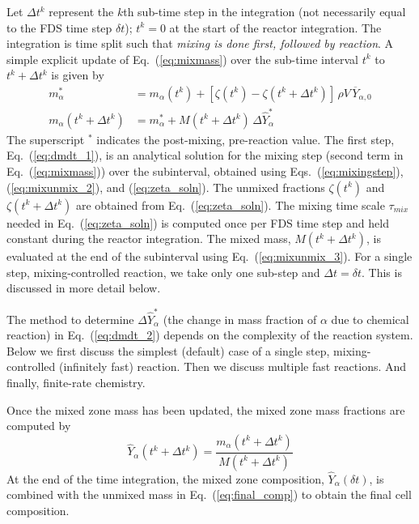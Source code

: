 Let $\Delta t^k$ represent the $k$th sub-time step in the integration (not necessarily equal to the FDS time step $\delta t$); $t^k=0$ at the start of the reactor integration.  The integration is time split such that \emph{mixing is done first, followed by reaction}. A simple explicit update of Eq.~(\ref{eq:mixmass}) over the sub-time interval $t^k$ to $t^k + \Delta t^k$ is given by
\begin{align}
\label{eq:dmdt_1} m_\alpha^* &= m_{\alpha}(t^k) + [ \zeta(t^k) - \zeta(t^k+\Delta t^k) ] \, \rho V \, \overline{Y}_{\alpha,0}  \\
\label{eq:dmdt_2} m_\alpha(t^k + \Delta t^k) &= m_{\alpha}^* + M(t^k + \Delta t^k) \, \Delta \hat{Y}_\alpha^*
\end{align}
The superscript $^*$ indicates the post-mixing, pre-reaction value.  The first step, Eq.~(\ref{eq:dmdt_1}), is an analytical solution for the mixing step (second term in Eq.~(\ref{eq:mixmass})) over the subinterval, obtained using Eqs.~(\ref{eq:mixingstep}), (\ref{eq:mixunmix_2}), and (\ref{eq:zeta_soln}).  The unmixed fractions $\zeta(t^k)$ and $\zeta(t^k + \Delta t^k)$ are obtained from Eq.~(\ref{eq:zeta_soln}). The mixing time scale $\tau_{mix}$ needed in Eq.~(\ref{eq:zeta_soln}) is computed once per FDS time step and held constant during the reactor integration. The mixed mass, $M(t^k + \Delta t^k)$, is evaluated at the end of the subinterval using Eq.~(\ref{eq:mixunmix_3}). For a single step, mixing-controlled reaction, we take only one sub-step and $\Delta t = \delta t$.  This is discussed in more detail below.  

The method to determine $\Delta \hat{Y}_\alpha^*$ (the change in mass fraction of $\alpha$ due to chemical reaction) in Eq.~(\ref{eq:dmdt_2}) depends on the complexity of the reaction system.  Below we first discuss the simplest (default) case of a single step, mixing-controlled (infinitely fast) reaction.  Then we discuss multiple fast reactions.  And finally, finite-rate chemistry.

Once the mixed zone mass has been updated, the mixed zone mass fractions are computed by
\begin{equation}
\label{eq:mixed_mass_fraction_sub}
\hat{Y}_\alpha(t^k + \Delta t^k) = \frac{m_\alpha(t^k + \Delta t^k)}{M(t^k + \Delta t^k)}
\end{equation}
At the end of the time integration, the mixed zone composition, $\hat{Y}_\alpha(\delta t)$, is combined with the unmixed mass in Eq.~(\ref{eq:final_comp}) to obtain the final cell composition.

